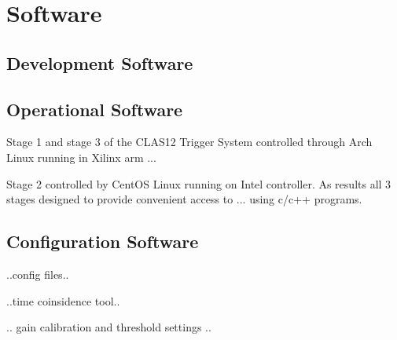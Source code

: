 \section{Software}



\subsection{Development Software}

\subsection{Operational Software}

Stage 1 and stage 3 of the CLAS12 Trigger System controlled through Arch Linux running in Xilinx arm ...

Stage 2 controlled by CentOS Linux running on Intel controller. As results all 3 stages designed to provide convenient access to ...
using c/c++ programs.

\subsection{Configuration Software}

..config files..

..time coinsidence tool..

.. gain calibration and threshold settings ..


